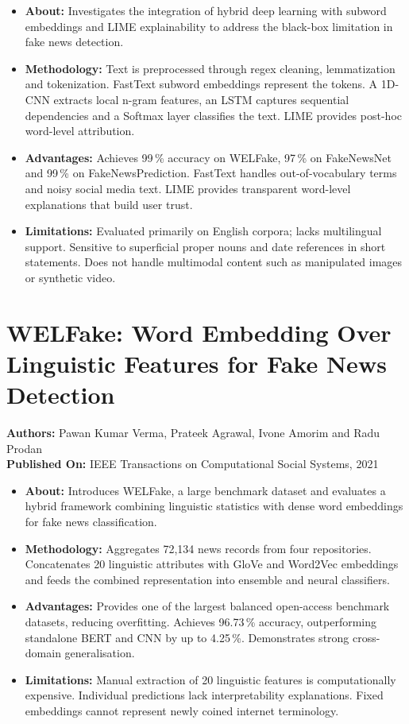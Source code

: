 \documentclass[12pt,a4paper,oneside]{report}
\begin{document}
\begin{itemize}[leftmargin=*, itemsep=2pt]
  \item \textbf{About:} Investigates the integration of hybrid deep learning with
        subword embeddings and LIME explainability to address the black-box limitation in
        fake news detection.
  \item \textbf{Methodology:} Text is preprocessed through regex cleaning, lemmatization
        and tokenization. FastText subword embeddings represent the tokens. A 1D-CNN
        extracts local n-gram features, an LSTM captures sequential dependencies and a
        Softmax layer classifies the text. LIME provides post-hoc word-level attribution.
  \item \textbf{Advantages:} Achieves 99\,\% accuracy on WELFake, 97\,\% on FakeNewsNet
        and 99\,\% on FakeNewsPrediction. FastText handles out-of-vocabulary terms and
        noisy social media text. LIME provides transparent word-level explanations that
        build user trust.
  \item \textbf{Limitations:} Evaluated primarily on English corpora; lacks multilingual
        support. Sensitive to superficial proper nouns and date references in short
        statements. Does not handle multimodal content such as manipulated images or
        synthetic video.
\end{itemize}

\section{WELFake: Word Embedding Over Linguistic Features for Fake News Detection}
\textbf{Authors:} Pawan Kumar Verma, Prateek Agrawal, Ivone Amorim and Radu Prodan\\
\textbf{Published On:} IEEE Transactions on Computational Social Systems, 2021

\begin{itemize}[leftmargin=*, itemsep=2pt]
  \item \textbf{About:} Introduces WELFake, a large benchmark dataset and evaluates a
        hybrid framework combining linguistic statistics with dense word embeddings for
        fake news classification.
  \item \textbf{Methodology:} Aggregates 72,134 news records from four repositories.
        Concatenates 20 linguistic attributes with GloVe and Word2Vec embeddings and
        feeds the combined representation into ensemble and neural classifiers.
  \item \textbf{Advantages:} Provides one of the largest balanced open-access benchmark
        datasets, reducing overfitting. Achieves 96.73\,\% accuracy, outperforming
        standalone BERT and CNN by up to 4.25\,\%. Demonstrates strong cross-domain
        generalisation.
  \item \textbf{Limitations:} Manual extraction of 20 linguistic features is
        computationally expensive. Individual predictions lack interpretability
        explanations. Fixed embeddings cannot represent newly coined internet
        terminology.
\end{itemize}
\end{document}
